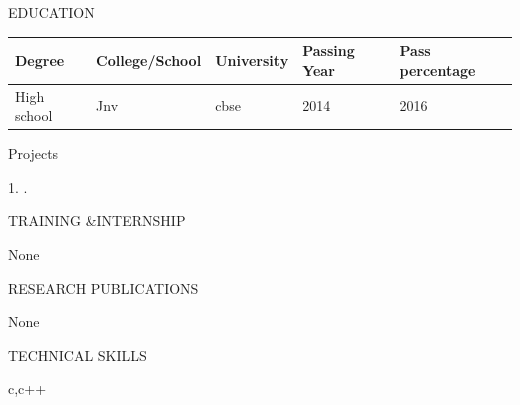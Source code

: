 \documentclass[10pt]{article}
\begin{document}
	\begin{minipage}[t][2cm][t]{0.2\textwidth}
	EDUCATION
		
	\end{minipage}
	\begin{minipage}[t][2cm][t]{0.8\textwidth}
		
	\begin{tabular}{ | l |  l |  l |  l |  l |} 
	\hline
	Degree & College/School & University & Passing Year & Pass percentage \\ 
	\hline
	\hline
	High school & Jnv & cbse & 2014 & 2016  \\ 
	\hline
	
	\end{tabular}
	\end{minipage}




	

	
	\begin{minipage}[t][2cm][t]{0.2\textwidth}
		Projects
		
	\end{minipage}
	\begin{minipage}[t][2cm][t]{0.8\textwidth}
		1.
		.
		
	\end{minipage}



	

	
	\begin{minipage}[t][2cm][t]{0.2\textwidth}
		TRAINING \&INTERNSHIP
		
	\end{minipage}
	\begin{minipage}[t][2cm][t]{0.8\textwidth}
		None

	\end{minipage}
	
		

		
	\begin{minipage}[t][2cm][t]{0.2\textwidth}
		RESEARCH PUBLICATIONS
		
	\end{minipage}
	\begin{minipage}[t][2cm][t]{0.8\textwidth}
		None
		
	\end{minipage}


		
	\begin{minipage}[t][2cm][t]{0.2\textwidth}
		TECHNICAL SKILLS
		
	\end{minipage}
	\begin{minipage}[t][2cm][t]{0.8\textwidth}
		c,c++
		
	\end{minipage}
\end{document}
